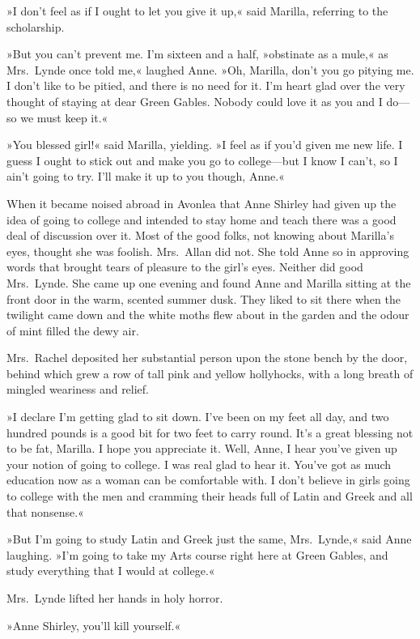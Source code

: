 »I don't feel as if I ought to let you give it up,« said Marilla, referring to the scholarship.

»But you can't prevent me. I'm sixteen and a half, »obstinate as a mule,« as Mrs.~Lynde once told me,« laughed Anne. »Oh, Marilla, don't you go pitying me. I don't like to be pitied, and there is no need for it. I'm heart glad over the very thought of staying at dear Green Gables. Nobody could love it as you and I do—so we must keep it.«

»You blessed girl!« said Marilla, yielding. »I feel as if you'd given me new life. I guess I ought to stick out and make you go to college—but I know I can't, so I ain't going to try. I'll make it up to you though, Anne.«

When it became noised abroad in Avonlea that Anne Shirley had given up the idea of going to college and intended to stay home and teach there was a good deal of discussion over it. Most of the good folks, not knowing about Marilla's eyes, thought she was foolish. Mrs.~Allan did not. She told Anne so in approving words that brought tears of pleasure to the girl's eyes. Neither did good Mrs.~Lynde. She came up one evening and found Anne and Marilla sitting at the front door in the warm, scented summer dusk. They liked to sit there when the twilight came down and the white moths flew about in the garden and the odour of mint filled the dewy air.

Mrs.~Rachel deposited her substantial person upon the stone bench by the door, behind which grew a row of tall pink and yellow hollyhocks, with a long breath of mingled weariness and relief.

»I declare I'm getting glad to sit down. I've been on my feet all day, and two hundred pounds is a good bit for two feet to carry round. It's a great blessing not to be fat, Marilla. I hope you appreciate it. Well, Anne, I hear you've given up your notion of going to college. I was real glad to hear it. You've got as much education now as a woman can be comfortable with. I don't believe in girls going to college with the men and cramming their heads full of Latin and Greek and all that nonsense.«

»But I'm going to study Latin and Greek just the same, Mrs.~Lynde,« said Anne laughing. »I'm going to take my Arts course right here at Green Gables, and study everything that I would at college.«

Mrs.~Lynde lifted her hands in holy horror.

»Anne Shirley, you'll kill yourself.«

